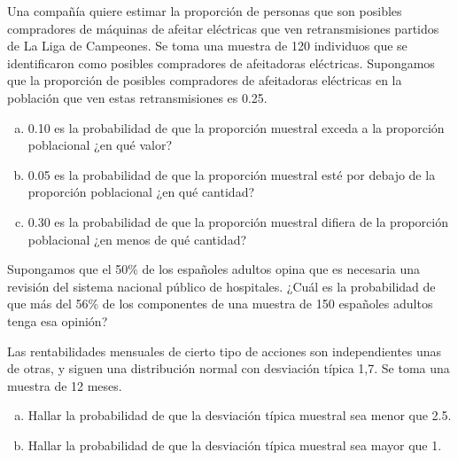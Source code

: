 \documentclass[12pt]{article}\usepackage[]{graphicx}\usepackage[]{color}
\begin{document}
\begin{prob}
Una compañía quiere estimar la proporción de personas que son posibles compradores de
máquinas de afeitar eléctricas que ven retransmisiones partidos de La Liga de Campeones. Se
toma una muestra de 120 individuos que se identificaron como posibles compradores de
afeitadoras eléctricas. Supongamos que la proporción de posibles compradores de afeitadoras
eléctricas  en la población que ven estas retransmisiones es 0.25.
\begin{enumerate}[a)]
\item 0.10 es la probabilidad de que la proporción muestral
exceda a la proporción poblacional ¿en qué valor?
\item 0.05 es la probabilidad de que la proporción muestral
esté por debajo de la proporción poblacional ¿en qué cantidad?
\item 0.30 es la probabilidad de que la proporción muestral
difiera de la proporción poblacional ¿en menos de qué cantidad?
\end{enumerate}
\end{prob}
\begin{prob}
Supongamos que el 50\% de los españoles adultos opina que es
necesaria una revisión del sistema nacional público de hospitales.
¿Cuál es la probabilidad de que más del 56\% de los componentes
de una muestra de 150 españoles adultos tenga esa opinión?
\end{prob}

\begin{prob} Las rentabilidades mensuales de cierto tipo de
acciones son independientes unas de otras, y siguen una
distribución normal con desviación típica 1,7. Se toma una
muestra de 12 meses.
\begin{enumerate}[a)]
\item Hallar la probabilidad de que la desviación típica muestral
sea menor que 2.5.
\item Hallar la probabilidad de que la desviación típica
muestral sea mayor que 1.
\end{enumerate}
\end{prob}
\end{document}
